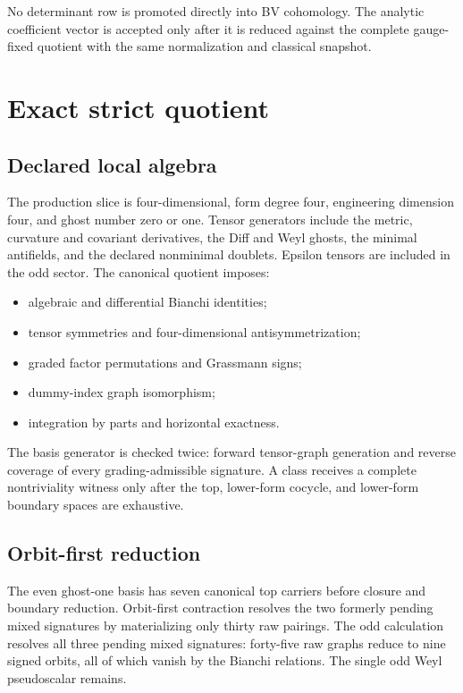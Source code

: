 \documentclass[11pt]{article}
\theoremstyle{definition}
\theoremstyle{remark}
\begin{document}
No determinant row is promoted directly into BV cohomology.  The analytic
coefficient vector is accepted only after it is reduced against the complete
gauge-fixed quotient with the same normalization and classical snapshot.

\section{Exact strict quotient}

\subsection{Declared local algebra}

The production slice is four-dimensional, form degree four, engineering
dimension four, and ghost number zero or one.  Tensor generators include the
metric, curvature and covariant derivatives, the Diff and Weyl ghosts, the
minimal antifields, and the declared nonminimal doublets.  Epsilon tensors
are included in the odd sector.  The canonical quotient imposes:
\begin{itemize}
\item algebraic and differential Bianchi identities;
\item tensor symmetries and four-dimensional antisymmetrization;
\item graded factor permutations and Grassmann signs;
\item dummy-index graph isomorphism;
\item integration by parts and horizontal exactness.
\end{itemize}

The basis generator is checked twice: forward tensor-graph generation and
reverse coverage of every grading-admissible signature.  A class receives a
complete nontriviality witness only after the top, lower-form cocycle, and
lower-form boundary spaces are exhaustive.

\subsection{Orbit-first reduction}

The even ghost-one basis has seven canonical top carriers before closure and
boundary reduction.  Orbit-first contraction resolves the two formerly
pending mixed signatures by materializing only thirty raw pairings.  The odd
calculation resolves all three pending mixed signatures: forty-five raw
graphs reduce to nine signed orbits, all of which vanish by the Bianchi
relations.  The single odd Weyl pseudoscalar remains.
\end{document}
